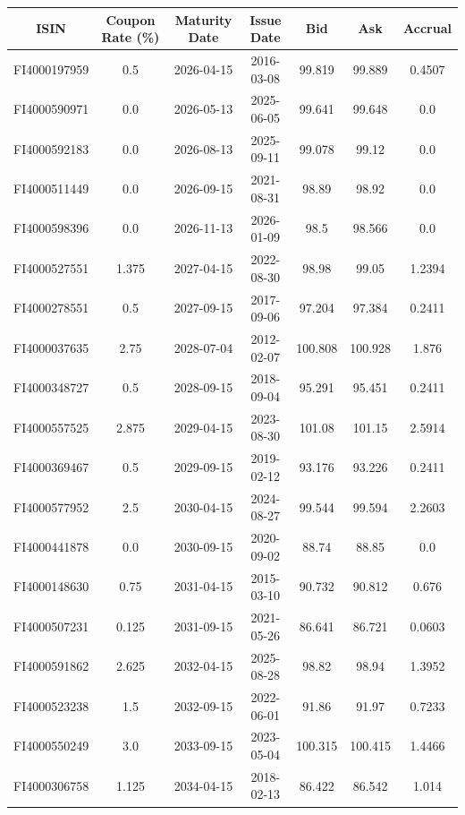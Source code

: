 \documentclass[a4paper]{artikel3}
\numberwithin{equation}{section}
\numberwithin{theorem}{section}
\numberwithin{proposition}{section}
\numberwithin{lemma}{section}
\begin{document}
\begin{table}[h!]
    \centering
    \begin{tabular}{| c | c | c | c | c | c | c |} 
\hline
ISIN & Coupon Rate (\%) & Maturity Date & Issue Date & Bid & Ask & Accrual  \\
\hline
\hline
FI4000197959 & 0.5 & 2026-04-15 & 2016-03-08 & 99.819 & 99.889 & 0.4507 \\
\hline
FI4000590971 & 0.0 & 2026-05-13 & 2025-06-05 & 99.641 & 99.648 & 0.0 \\
\hline
FI4000592183 & 0.0 & 2026-08-13 & 2025-09-11 & 99.078 & 99.12 & 0.0 \\
\hline
FI4000511449 & 0.0 & 2026-09-15 & 2021-08-31 & 98.89 & 98.92 & 0.0 \\
\hline
FI4000598396 & 0.0 & 2026-11-13 & 2026-01-09 & 98.5 & 98.566 & 0.0 \\
\hline
FI4000527551 & 1.375 & 2027-04-15 & 2022-08-30 & 98.98 & 99.05 & 1.2394 \\
\hline
FI4000278551 & 0.5 & 2027-09-15 & 2017-09-06 & 97.204 & 97.384 & 0.2411 \\
\hline
FI4000037635 & 2.75 & 2028-07-04 & 2012-02-07 & 100.808 & 100.928 & 1.876 \\
\hline
FI4000348727 & 0.5 & 2028-09-15 & 2018-09-04 & 95.291 & 95.451 & 0.2411 \\
\hline
FI4000557525 & 2.875 & 2029-04-15 & 2023-08-30 & 101.08 & 101.15 & 2.5914 \\
\hline
FI4000369467 & 0.5 & 2029-09-15 & 2019-02-12 & 93.176 & 93.226 & 0.2411 \\
\hline
FI4000577952 & 2.5 & 2030-04-15 & 2024-08-27 & 99.544 & 99.594 & 2.2603 \\
\hline
FI4000441878 & 0.0 & 2030-09-15 & 2020-09-02 & 88.74 & 88.85 & 0.0 \\
\hline
FI4000148630 & 0.75 & 2031-04-15 & 2015-03-10 & 90.732 & 90.812 & 0.676 \\
\hline
FI4000507231 & 0.125 & 2031-09-15 & 2021-05-26 & 86.641 & 86.721 & 0.0603 \\
\hline
FI4000591862 & 2.625 & 2032-04-15 & 2025-08-28 & 98.82 & 98.94 & 1.3952 \\
\hline
FI4000523238 & 1.5 & 2032-09-15 & 2022-06-01 & 91.86 & 91.97 & 0.7233 \\
\hline
FI4000550249 & 3.0 & 2033-09-15 & 2023-05-04 & 100.315 & 100.415 & 1.4466 \\
\hline
FI4000306758 & 1.125 & 2034-04-15 & 2018-02-13 & 86.422 & 86.542 & 1.014 \\

\end{tabular}
\end{table}
\end{document}
